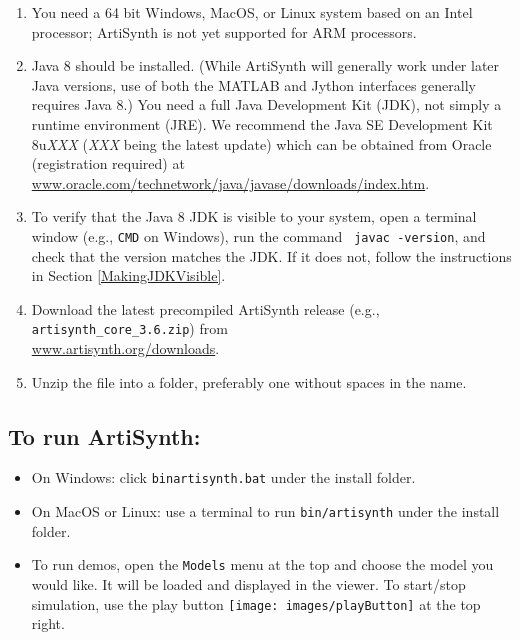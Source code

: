 \documentclass{article}
\begin{document}
\begin{enumerate}

\item You need a 64 bit Windows, MacOS, or Linux system based on an
Intel processor; ArtiSynth is not yet supported for ARM processors.

\item Java 8 should be installed. (While ArtiSynth will generally work
under later Java versions, use of both the MATLAB and Jython
interfaces generally requires Java 8.)
You need a full Java Development Kit
(JDK), not simply a runtime environment (JRE). We recommend the Java
SE Development Kit 8u{\it XXX} ({\it XXX} being the latest update)
which can be obtained from Oracle (registration required)
at\\ \href{https://www.oracle.com/technetwork/java/javase/downloads/index.html}%
{www.oracle.com/technetwork/java/javase/downloads/index.htm}.
 
\item To verify that the Java 8 JDK is visible to your system, open a
terminal window (e.g., {\tt CMD} on Windows), run the command {\tt
javac -version}, and check that the version matches the JDK.  If it
does not, follow the instructions in Section
\ref{MakingJDKVisible}.

\item Download the latest precompiled ArtiSynth release 
(e.g., {\tt artisynth\_core\_3.6.zip}) from
\iflatexml\else\\\fi %
\href{https://www.artisynth.org/downloads}{www.artisynth.org/downloads}.
 
\item Unzip the file into a folder, preferably one without spaces in the
name.

\end{enumerate}
 
\subsection{To run ArtiSynth:}

\begin{itemize}[leftmargin=26pt]
 
\item On Windows: click {\tt bin\BKS artisynth.bat} under the install folder. 
 
\item On MacOS or Linux: use a terminal to run {\tt bin/artisynth} 
under the install folder.

\item[\ ] To run demos, open the {\tt Models} menu at the top and
choose the model you would like. It will be loaded and displayed in
the viewer. To start/stop simulation, use the play button
\texttt{[image: images/playButton]} at the top right.

\end{itemize}
\end{document}
